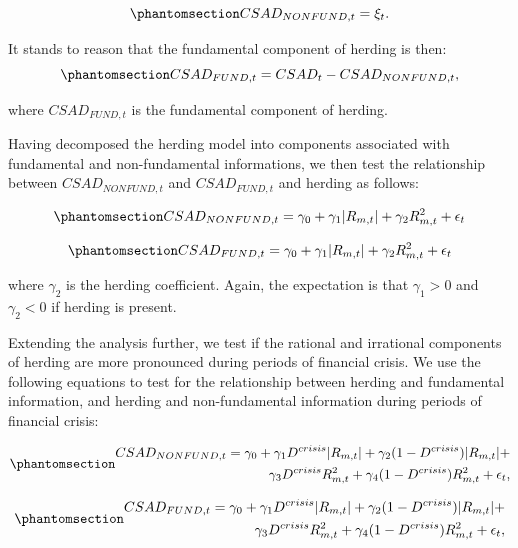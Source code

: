 \documentclass[
  letterpaper,
  DIV=11,
  numbers=noendperiod]{scrartcl}
\begin{document}
\begin{equation}\phantomsection\label{eq-nonfunda}{
CSAD_{NONFUND, t} = \xi_t.
}\end{equation}

It stands to reason that the fundamental component of herding is then:
\begin{equation}\phantomsection\label{eq-funda}{
CSAD_{FUND, t} = CSAD_t - CSAD_{NONFUND, t},
}\end{equation}

where \(CSAD_{FUND, t}\) is the fundamental component of herding.

Having decomposed the herding model into components associated with
fundamental and non-fundamental informations, we then test the
relationship between \(CSAD_{NONFUND, t}\) and \(CSAD_{FUND, t}\) and
herding as follows:

\begin{equation}\phantomsection\label{eq-nonfundaherd}{
CSAD_{NONFUND,t} = \gamma_0 +  \gamma_1|R_{m, t}| +  \gamma_2R_{m, t}^2 + \epsilon_{t}
}\end{equation}

\begin{equation}\phantomsection\label{eq-fundaherd}{
CSAD_{FUND,t} = \gamma_0 +  \gamma_1|R_{m, t}| +  \gamma_2R_{m, t}^2 + \epsilon_{t}
}\end{equation}

where \(\gamma_2\) is the herding coefficient. Again, the expectation is
that \(\gamma_1 > 0\) and \(\gamma_2 < 0\) if herding is present.

Extending the analysis further, we test if the rational and irrational
components of herding are more pronounced during periods of financial
crisis. We use the following equations to test for the relationship
between herding and fundamental information, and herding and
non-fundamental information during periods of financial crisis:

\begin{equation}\phantomsection\label{eq-nonfundacrisis}{
\begin{aligned}
CSAD_{NONFUND, t} = \gamma_0 +  \gamma_1D^{crisis}|R_{m, t}| + \gamma_2(1 - D^{crisis})|R_{m,t}|  + \\  
\gamma_3D^{crisis}R_{m, t}^2 + \gamma_4(1-D^{crisis})R_{m,t}^2 + \epsilon_{t},
\end{aligned}
}\end{equation}

\begin{equation}\phantomsection\label{eq-fundacrisis}{
\begin{aligned}
CSAD_{FUND, t} = \gamma_0 +  \gamma_1D^{crisis}|R_{m, t}| + \gamma_2(1 - D^{crisis})|R_{m,t}|  + \\ \gamma_3D^{crisis}R_{m, t}^2 + \gamma_4(1-D^{crisis})R_{m,t}^2 + \epsilon_{t},
\end{aligned}
}\end{equation}
\end{document}
